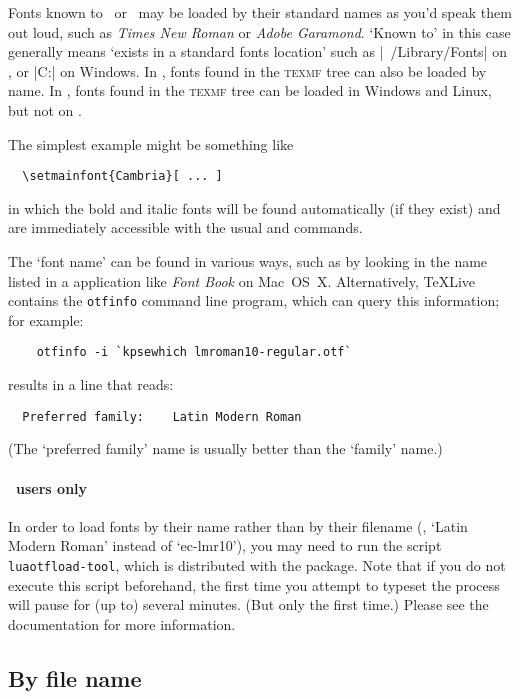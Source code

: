 \documentclass[a4paper]{l3doc}
\begin{document}
Fonts known to \LuaTeX\ or \XeTeX\ may be loaded by their standard names as
you'd speak them out loud, such as \emph{Times New Roman} or
\emph{Adobe Garamond}.
`Known to' in this case generally means `exists in a standard fonts location'
such as |~/Library/Fonts| on \MacOSX, or |C:\Windows\Fonts| on Windows.
In \LuaTeX, fonts found in the \textsc{texmf} tree can also be loaded by name.
In \XeTeX, fonts found in the \textsc{texmf} tree can be loaded in Windows and Linux,
but not on \MacOSX.

The simplest example might be something like
\begin{Verbatim}
  \setmainfont{Cambria}[ ... ]
\end{Verbatim}
in which the bold and italic fonts will be found automatically
(if they exist) and are immediately accessible with the usual
 and  commands.

The `font name' can be found in various ways, such as by looking in the name listed in a application like \emph{Font Book} on Mac~OS~X.
Alternatively, \TeX{}Live contains the \texttt{otfinfo} command line program, which can query this information; for example:
\begin{Verbatim}
    otfinfo -i `kpsewhich lmroman10-regular.otf`
\end{Verbatim}
results in a line that reads:
\begin{Verbatim}
  Preferred family:    Latin Modern Roman
\end{Verbatim}
(The `preferred family' name is usually better than the `family' name.)

\paragraph{\LuaTeX\ users only}
In order to load fonts by their name rather than by their filename (\eg,
`Latin Modern Roman' instead of `ec-lmr10'), you may need to run the script
\texttt{luaotfload-tool}, which is distributed with the 
package. Note that if you do not execute this script beforehand, the first
time you attempt to typeset the process will pause for (up to) several
minutes. (But only the first time.)
Please see the  documentation for more information.


\subsection{By file name}
\label{sec:by-file-name}
\end{document}
